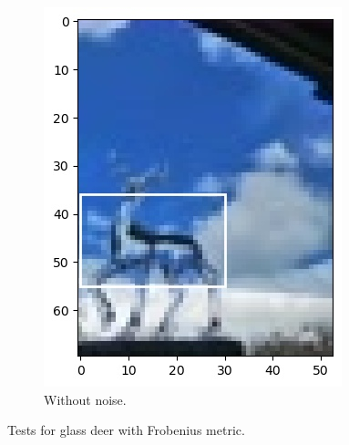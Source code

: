 \documentclass[11pt]{article}
\theoremstyle{definition}
\theoremstyle{remark}
\theoremstyle{remark}
\theoremstyle{remark}
\begin{document}
\begin{figure}[H]
\begin{subfigure}[b]{0.32\textwidth}
    \includegraphics[width=\textwidth]{figs/1-3-1-test_case3.jpg}
    \caption{Without noise.}
  \end{subfigure}
  \caption{Tests for glass deer with Frobenius metric.}
  \label{fig:test_deer_fro}
\end{figure}
\end{document}
